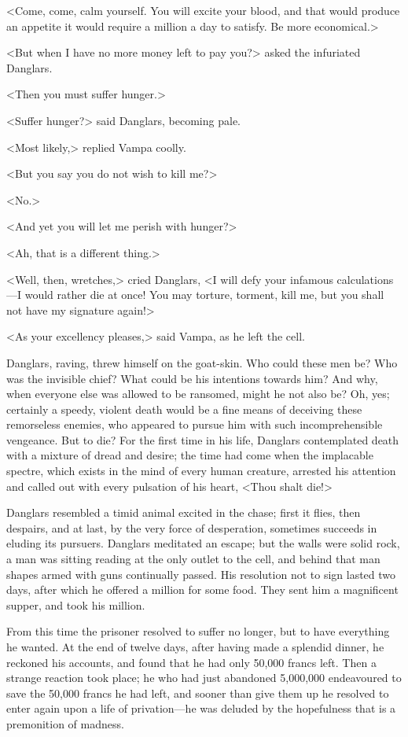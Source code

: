  <Come, come, calm yourself. You will excite your blood, and that would produce an appetite it would require a million a day to satisfy. Be more economical.> 

 <But when I have no more money left to pay you?> asked the infuriated Danglars. 

 <Then you must suffer hunger.> 

 <Suffer hunger?> said Danglars, becoming pale. 

 <Most likely,> replied Vampa coolly. 

 <But you say you do not wish to kill me?> 

 <No.> 

 <And yet you will let me perish with hunger?> 

 <Ah, that is a different thing.> 

 <Well, then, wretches,> cried Danglars, <I will defy your infamous calculations—I would rather die at once! You may torture, torment, kill me, but you shall not have my signature again!> 

 <As your excellency pleases,> said Vampa, as he left the cell. 

 Danglars, raving, threw himself on the goat-skin. Who could these men be? Who was the invisible chief? What could be his intentions towards him? And why, when everyone else was allowed to be ransomed, might he not also be? Oh, yes; certainly a speedy, violent death would be a fine means of deceiving these remorseless enemies, who appeared to pursue him with such incomprehensible vengeance. But to die? For the first time in his life, Danglars contemplated death with a mixture of dread and desire; the time had come when the implacable spectre, which exists in the mind of every human creature, arrested his attention and called out with every pulsation of his heart, <Thou shalt die!> 

 Danglars resembled a timid animal excited in the chase; first it flies, then despairs, and at last, by the very force of desperation, sometimes succeeds in eluding its pursuers. Danglars meditated an escape; but the walls were solid rock, a man was sitting reading at the only outlet to the cell, and behind that man shapes armed with guns continually passed. His resolution not to sign lasted two days, after which he offered a million for some food. They sent him a magnificent supper, and took his million. 

 From this time the prisoner resolved to suffer no longer, but to have everything he wanted. At the end of twelve days, after having made a splendid dinner, he reckoned his accounts, and found that he had only 50,000 francs left. Then a strange reaction took place; he who had just abandoned 5,000,000 endeavoured to save the 50,000 francs he had left, and sooner than give them up he resolved to enter again upon a life of privation—he was deluded by the hopefulness that is a premonition of madness. 

